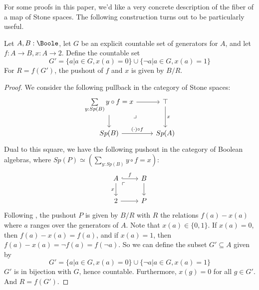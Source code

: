 For some proofs in this paper, 
we'd like a very concrete description of the fiber of a map of Stone spaces. 
The following construction turns out to be particularly useful. 
\begin{lemma}\label{FiberConstruction}
  Let $A,B:\Boole$, let $G$ be an explicit countable set of generators for $A$, and let 
  $f:A \to B, x:A\to 2$. 
  Define the countable set 
  \begin{equation}
    G' = \{a | a\in G, x(a) = 0\} \cup \{\neg a | a \in G, x(a) = 1\}
  \end{equation} 
  For $R = f(G')$,
  the pushout of $f$ and $x$ is given by $B/R$. 
\end{lemma}  
\begin{proof}
We consider the following pullback in the category of Stone spaces:
  \begin{equation}\begin{tikzcd}
    \sum\limits_{y:Sp(B)} y\circ f = x \arrow[d] \arrow[r] \arrow["\lrcorner"{pos=0.125}, phantom, dr] 
    & \top \arrow[d,"x"]\\
    Sp(B) \arrow[r,"(\cdot) \circ f"] & Sp(A)
  \end{tikzcd}  \end{equation}
Dual to this square, we have the following pushout in the category of Boolean algebras,
where $Sp(P) \simeq  (\sum\limits_{y:Sp(B)} y \circ f = x)$:
  \begin{equation}\begin{tikzcd}
    A \arrow[d,"x"'] \arrow[r,hook,"f"] \arrow[rd,phantom,"\ulcorner"{pos=0.125}] & B\arrow[d]\\
    2 \arrow[r] & P
  \end{tikzcd}\end{equation} 
  Following , 
  the pushout $P$ is given by $B/R$ with $R$ the relations $f(a) -x(a)$ 
  where $a$ ranges over the generators of $A$.
  Note that $x(a) \in \{0,1\}$. 
  If $x(a)=0$, then $f(a)-x(a) = f(a)$, 
  and if $x(a) = 1$, then $f(a) -x(a) = \neg f(a) = f(\neg a)$. 
  So we can define the subset $G'\subseteq A$ given by 
  \begin{equation}
    G' = \{a | a\in G, x(a) = 0\} \cup \{\neg a | a \in G, x(a) = 1\}
  \end{equation} 
  $G'$ is in bijection with $G$, hence countable. 
  Furthermore, $x(g) = 0$ for all $g\in G'$. 
  And $R = f(G')$.
\end{proof}
